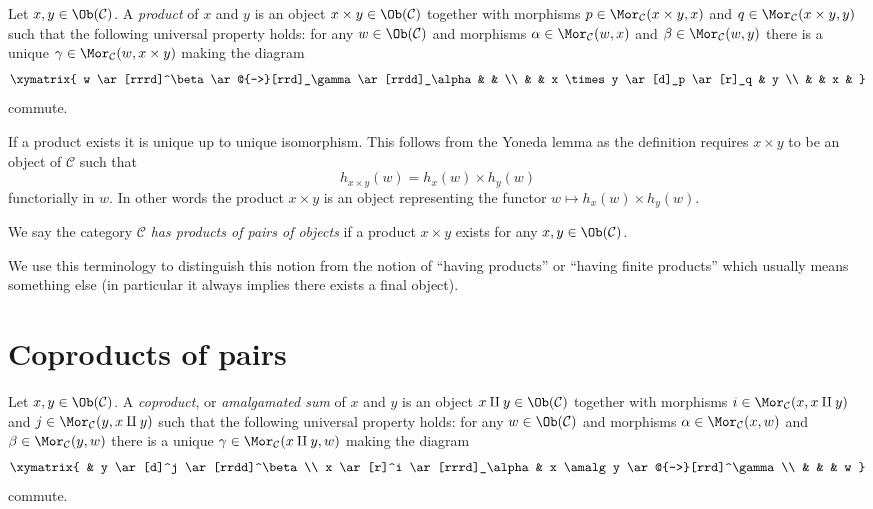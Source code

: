 \begin{definition}
\label{definition-products}
Let $x, y\in \Ob(\mathcal{C})$.
A {\it product} of $x$ and $y$ is
an object $x \times y \in \Ob(\mathcal{C})$
together with morphisms
$p\in \Mor_{\mathcal C}(x \times y, x)$ and
$q\in\Mor_{\mathcal C}(x \times y, y)$ such
that the following universal property holds: for
any $w\in \Ob(\mathcal{C})$ and morphisms
$\alpha \in \Mor_{\mathcal C}(w, x)$ and
$\beta \in \Mor_\mathcal{C}(w, y)$
there is a unique
$\gamma\in \Mor_{\mathcal C}(w, x \times y)$ making
the diagram
$$
\xymatrix{
w \ar[rrrd]^\beta \ar@{-->}[rrd]_\gamma \ar[rrdd]_\alpha & & \\
& & x \times y \ar[d]_p \ar[r]_q & y \\
& & x &
}
$$
commute.
\end{definition}

\noindent
If a product exists it is unique up to unique
isomorphism. This follows from the Yoneda lemma as
the definition requires $x \times y$ to be an object
of $\mathcal{C}$ such that
$$
h_{x \times y}(w) = h_x(w) \times h_y(w)
$$
functorially in $w$. In other words the product $x \times y$
is an object representing the functor
$w \mapsto h_x(w) \times h_y(w)$.

\begin{definition}
\label{definition-has-products-of-pairs}
We say the category $\mathcal{C}$ {\it has products of pairs
of objects} if a product $x \times y$
exists for any $x, y \in \Ob(\mathcal{C})$.
\end{definition}

\noindent
We use this terminology to distinguish this notion from the notion
of ``having products'' or ``having finite products'' which usually means
something else (in particular it always implies there exists a
final object).





\section{Coproducts of pairs}
\label{section-coproducts-pairs}

\begin{definition}
\label{definition-coproducts}
Let $x, y \in \Ob(\mathcal{C})$.
A {\it coproduct}, or {\it amalgamated sum} of $x$ and $y$ is
an object $x \amalg y \in \Ob(\mathcal{C})$
together with morphisms
$i \in \Mor_{\mathcal C}(x, x \amalg y)$ and
$j \in \Mor_{\mathcal C}(y, x \amalg y)$ such
that the following universal property holds: for
any $w \in \Ob(\mathcal{C})$ and morphisms
$\alpha \in \Mor_{\mathcal C}(x, w)$ and
$\beta \in \Mor_\mathcal{C}(y, w)$
there is a unique
$\gamma \in \Mor_{\mathcal C}(x \amalg y, w)$ making
the diagram
$$
\xymatrix{
& y \ar[d]^j \ar[rrdd]^\beta \\
x \ar[r]^i \ar[rrrd]_\alpha & x \amalg y \ar@{-->}[rrd]^\gamma \\
& & & w
}
$$
commute.
\end{definition}

